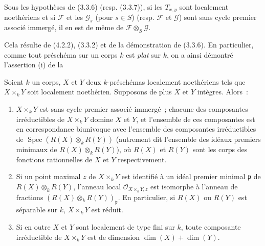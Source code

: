 \begin{corollary}[4.2.3]
\label{IV.2.4.2.3-fr}
Sous les hypothèses de \textup{(3.3.6) (resp. (3.3.7))}, si les $T_{x,y}$ sont
localement noethériens et si $\mathcal F$ et les $\mathcal G_s$ \textup{(}pour $s\in S$\textup{)}
\textup{(resp.} $\mathcal F$ et $\mathcal G$\textup{)} sont sans cycle premier associé immergé,
il en est de même de $\mathcal F\otimes_S\mathcal G$.
\end{corollary}

Cela résulte de (4.2.2), (3.3.2) et de la démonstration de (3.3.6). En
particulier, comme tout préschéma sur un corps $k$ est \emph{plat} sur $k$, on
a ainsi démontré l'assertion (i) de la

\begin{proposition}[4.2.4]
\label{IV.2.4.2.4-fr}
Soient $k$ un corps, $X$ et $Y$ deux $k$-préschémas localement noethériens
tels que $X\times_k Y$ soit localement noethérien. Supposons de plus $X$ et
$Y$ intègres. Alors~:
\begin{enumerate}
\item[\textup{(i)}] $X\times_k Y$ est sans cycle premier associé immergé~; chacune des
composantes irréductibles de $X\times_k Y$ domine $X$ et $Y$, et l'ensemble de
ces composantes est en correspondance biunivoque avec l'ensemble des
composantes irréductibles de
$\operatorname{Spec}(R(X)\otimes_k R(Y))$ \textup{(autrement dit} l'ensemble des
idéaux premiers minimaux de $R(X)\otimes_k R(Y)$\textup{)}, où $R(X)$ et $R(Y)$ sont
les corps des fonctions rationnelles de $X$ et $Y$ respectivement.
\item[\textup{(ii)}] Si un point maximal $z$ de $X\times_k Y$ est identifié à un idéal
premier minimal $\mathfrak p$ de $R(X)\otimes_k R(Y)$, l'anneau local
$\mathcal O_{X\times_k Y,z}$ est isomorphe à l'anneau de fractions
$(R(X)\otimes_k R(Y))_{\mathfrak p}$. En particulier, si $R(X)$ ou $R(Y)$ est
séparable sur $k$, $X\times_k Y$ est réduit.


\item[\textup{(iii)}] Si en outre $X$ et $Y$ sont localement de type fini sur $k$,
toute composante irréductible de $X\times_k Y$ est de dimension
$\dim(X)+\dim(Y)$.
\end{enumerate}
\end{proposition}

